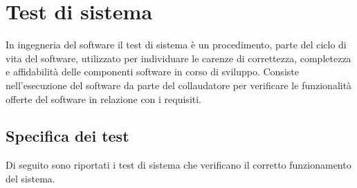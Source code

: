 \section{Test di sistema}\label{sec:test-di-sistema}
In ingegneria del software il test di sistema è un procedimento, parte del ciclo di vita del software, utilizzato per individuare le carenze di correttezza, completezza e affidabilità delle componenti software in corso di sviluppo.
Consiste nell'esecuzione del software da parte del collaudatore per verificare le funzionalità offerte del software in relazione con i requisiti.
\setcounter{rowcount}{0}

\subsection{Specifica dei test}\label{subsec:specifica-dei-test-sistema}
Di seguito sono riportati i test di sistema che verificano il corretto funzionamento del sistema.
